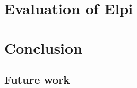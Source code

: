 \documentclass[11pt,a4paper]{report}
\begin{document}


\tableofcontents






% 


\chapter{Evaluation of Elpi} \label{ch:evalelpi}




\chapter{Conclusion}\label{ch:conclusion}
\section{Future work}

\printbibliography

\newpage
\mbox{}
\thispagestyle{empty}
\newpage
\mbox{}
\thispagestyle{empty}
\end{document}
